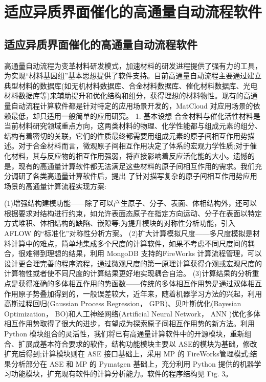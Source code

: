 \chapter{适应异质界面催化的高通量自动流程软件}
\section{适应异质界面催化的高通量自动流程软件}
高通量自动流程为变革材料研发模式，加速材料的研发进程提供了强有力的工具，为实现“材料基因组”基本思想提供了软件支持。目前高通量自动流程主要通过建立典型材料的数据库(如无机材料数据库、合金材料数据库、催化材料数据库、光电材料数据库等)来辅助提升和优化结构和组分，获得理想的材料物性。现有的高通量自动流程计算软件都是针对特定的应用场景开发的，MatCloud 对应用场景的依赖最低，却只适用一般简单的应用研究。
1. 基本设想
合金材料与催化活性材料是当前材料研究领域重点方向，这两类材料的物理、化学性能都与组成元素的组分、结构有着密切的关联，它们的性质最终都需要用组成元素的原子间相互作用势描述。对于合金材料而言，微观原子间相互作用决定了体系的宏观力学性质;对于催化材料，其与反应物的相互作用强弱，将直接影响着反应活化能的大小。遗憾的是，现有的高通量计算软件都无法满足这些材料的原子间相互作用的需求。我们充分调研了各类高通量计算软件后，提出 了针对描写复杂的原子间相互作用势应用场景的高通量计算流程实现方案:

(1)增强结构建模功能——除了可以产生原子、分子、表面、体相结构外，还可以根据要求对结构进行约束，如允许表面态原子在指定方向运动、分子在表面以特定方式堆积、体相结构的缺陷、嵌隙等;为提升模块的对称性分析功能，引入 AFLOW 的“标准化”对称性分析方案。
(2)扩大计算模拟尺度——多尺度模拟是材料计算中的难点，简单地集成多个尺度的计算软件，如果不考虑不同尺度间的耦合，很难得到理想的结果，利用 MongoDB 支持的FireWorks 计算流程管理，可以设计更合理完善的程序流程，通过微观尺度的第一原理计算获得介观或宏观尺度的计算物性或者使不同尺度的计算结果更好地实现耦合自洽。
(3)计算结果的分析重点是获得准确的多体相互作用的势函数——传统的多体相互作用势是通过双体相互作用原子势叠加得到的，一般误差较大，近年来，随着机器学习方法的兴起，利用高斯过程回归(Gaussian Process Regression， GPR)、贝叶斯优化(Bayesian Optimization， BO)和人工神经网络(Artificial Neural Network， ANN )优化多体相互作用势取得了很大的进步，有望成为探索原子间相互作用势的新方法。利用 Python 模块组合的灵活性，我们将已有高通量计算软件中的开源模块，重新组合、扩展成基本符合要求的软件，结构功能模块主要以 ASE的模块为基础，修改扩充后得到;计算模块则在 ASE 接口基础上，采用 MP 的 FireWorks管理模式;结果分析部分在 ASE 和 MP 的 Pymatgen 基础上，充分利用 Python 提供的机器学习功能模块，扩充现有软件的计算分析能力。软件的程序结构见 Fig. 3。

